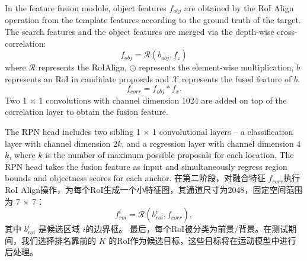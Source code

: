 In the feature fusion module, object features $f_{obj}$ are obtained by the RoI Align operation from the template features according to the ground truth of the target. The search features and the object features are merged via the depth-wise cross-correlation:
\begin{equation}
    f_{obj} = \mathcal{R}(b_{obj}, f_{z})
\end{equation}
where $\mathcal{R}$ represents the RoIAlign, $\odot$ represents the element-wise multiplication, $b$ represents an RoI in candidate proposals and $\mathcal{X}$ represents the fused feature of $b$.
\begin{equation}
    f_{corr} = f_{obj} * f_{x}.
\end{equation}
Two 1 $\times$ 1 convolutions with channel dimension 1024 are added on top of the correlation layer to obtain the fusion feature.

The RPN head includes two sibling 1 $\times$ 1 convolutional layers -- a classification layer with channel dimension 2$k$, and a regression layer with channel dimension 4$k$, where $k$ is the number of maximum possible proposals for each location. The RPN head takes the fusion feature as input and simultaneously regress region bounds and objectness scores for each anchor.
\fi
在第二阶段，对融合特征 $f_{corr}$执行RoI Align操作，为每个RoI生成一个小特征图，其通道尺寸为2048，固定空间范围为 7 $\times$ 7：
\begin{equation}
    f_{roi}^{i} = \mathcal{R}(b_{roi}^{i}, f_{corr}),
\end{equation}
其中 $b_{roi}^{i}$ 是候选区域 $i$的边界框。
最后，每个RoI被分类为前景/背景。在测试期间，我们选择排名靠前的 $K$ 的RoI作为候选目标，这些目标将在运动模型中进行后处理。

